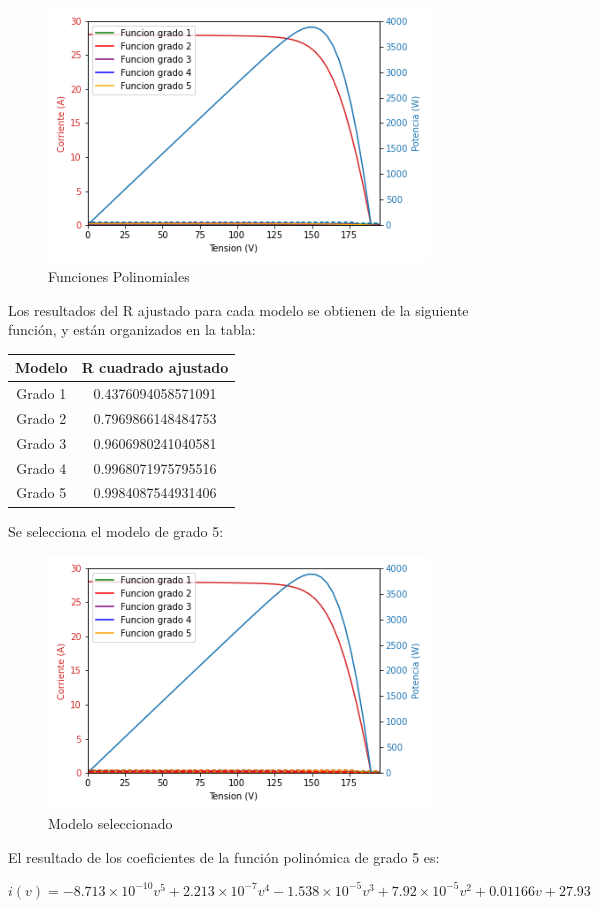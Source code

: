 \documentclass[a4paper,12pt]{article}
\begin{document}
\begin{itemize}
		

		\begin{figure}[htb]
			\centering
			\includegraphics[width=0.9\textwidth]{./imagenes/curvaajuste.png}
			\caption{Funciones Polinomiales}
		\end{figure} 
	
Los resultados del R ajustado para cada modelo se obtienen de la siguiente función, y están organizados en la tabla:


		
	\end{itemize}
	
	\begin{tabular}{| c | c |}
		\hline
		Modelo & R cuadrado ajustado \\ \hline
		Grado 1 & 0.4376094058571091 \\
		Grado 2 & 0.7969866148484753 \\
		Grado 3 & 0.9606980241040581 \\
		Grado 4 & 0.9968071975795516 \\
		Grado 5 & 0.9984087544931406 \\ \hline
	\end{tabular}
	 
	
	 Se selecciona el modelo de grado 5:
	 
	 \begin{figure}[htb]
	 	\centering
	 	\includegraphics[width=0.9\textwidth]{./imagenes/modeloSel.png}
	 	\caption{Modelo seleccionado}
	 \end{figure}
	 
	El resultado de los coeficientes de la función polinómica de grado 5 es:
	
	\begin{equation*}
		i(v) = -8.713\times 10^{-10}v^5 + 2.213\times 10^{-7} v^4 - 1.538\times 10^{-5} v^3 + 7.92\times 10^{-5} v^2 + 0.01166 v + 27.93
	\end{equation*}
\end{document}
